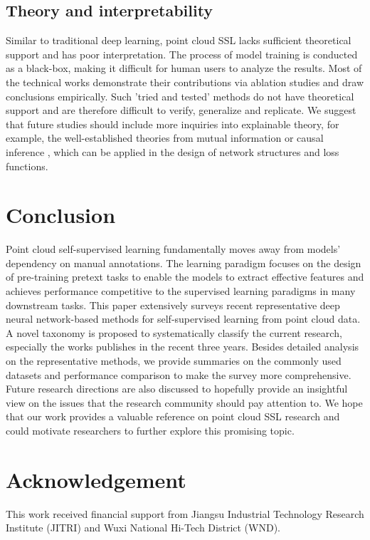\documentclass[a4paper,fleqn]{cas-dc}
\begin{document}
\subsection{Theory and interpretability}
Similar to traditional deep learning, point cloud SSL lacks sufficient theoretical support and has poor interpretation. The process of model training is conducted as a black-box, making it difficult for human users to analyze the results. Most of the technical works demonstrate their contributions via ablation studies and draw conclusions empirically. Such 'tried and tested' methods do not have theoretical support and are therefore difficult to verify, generalize and replicate. We suggest that future studies should include more inquiries into explainable theory, for example, the well-established theories from mutual information \citep{sayed2018cross} or causal inference \citep{wang2022causal}, which can be applied in the design of network structures and loss functions.


\section{Conclusion} \label{sec:conclusion}
Point cloud self-supervised learning fundamentally moves away from models' dependency on manual annotations. The learning paradigm focuses on the design of pre-training pretext tasks to enable the models to extract effective features and achieves performance competitive to the supervised learning paradigms in many downstream tasks. This paper extensively surveys recent representative deep neural network-based methods for self-supervised learning from point cloud data. A novel taxonomy is proposed to systematically classify the current research, especially the works publishes in the recent three years. Besides detailed analysis on the representative methods, we provide summaries on the commonly used datasets and performance comparison to make the survey more comprehensive. Future research directions are also discussed to hopefully provide an insightful view on the issues that the research community should pay attention to. We hope that our work provides a valuable reference on point cloud SSL research and could motivate researchers to further explore this promising topic.


\section{Acknowledgement}
This work received financial support from Jiangsu Industrial Technology Research Institute (JITRI) and Wuxi National Hi-Tech District (WND).

% 


\end{document}
